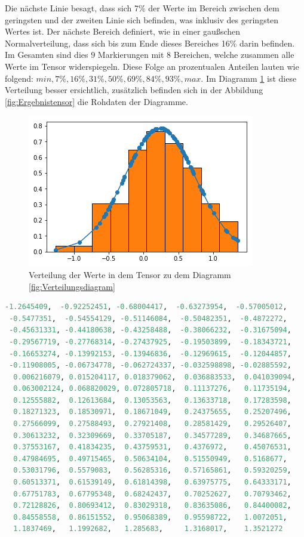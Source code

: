 Die nächste Linie besagt, dass sich 7\% der Werte im Bereich zwischen dem geringsten und der zweiten Linie sich befinden, was inklusiv des geringsten Wertes ist.  
Der nächste Bereich definiert, wie in einer gaußschen Normalverteilung, dass sich bis zum Ende dieses Bereiches 16\% darin befinden. 
Im Gesamten sind dies $9$ Markierungen mit 8 Bereichen, welche zusammen alle Werte im Tensor widerspiegeln. 
Diese Folge an prozentualen Anteilen lauten wie folgend: $min, 7\%, 16\%, 31\%, 50\%, 69\%, 84\%, 93\%, max$. 
Im Diagramm \ref{fig:VerteilungsdiagrammPython} ist diese Verteilung besser ersichtlich, zusätzlich befinden sich in der Abbildung \ref{fig:Ergebnistensor} die Rohdaten der Diagramme. 
\begin{figure}
	\centering
	\includegraphics[scale=0.6]{images/gaussian.png}
	\caption{Verteilung der Werte in dem Tensor zu dem Diagramm \ref{fig:Verteilungsdiagram}}
	\label{fig:VerteilungsdiagrammPython}
\end{figure}
\begin{lstlisting}[caption={Sortierter Ergebnistensor zum Verteilungsdiagramm \ref{fig:VerteilungsdiagrammPython} und \ref{fig:Verteilungsdiagram} im Schritt $0$},label=fig:Ergebnistensor,captionpos=b,language=Python]
 -1.2645409,  -0.92252451, -0.68004417,  -0.63273954,  -0.57005012, 
 -0.5477351,  -0.54554129, -0.51146084,  -0.50482351,  -0.4872272, 
 -0.45631331, -0.44180638, -0.43258488,  -0.38066232,  -0.31675094, 
 -0.29567719, -0.27768314, -0.27437925,  -0.19503899,  -0.18343721, 
 -0.16653274, -0.13992153, -0.13946836,  -0.12969615,  -0.12044857, 
 -0.11908005, -0.06734778, -0.062724337, -0.032598898, -0.02885592, 
  0.006216079, 0.015204117, 0.018379062,  0.036883533,  0.041039094, 
  0.063002124, 0.068820029, 0.072805718,  0.11137276,   0.11735194, 
  0.12555882,  0.12613684,  0.13053563,   0.13633718,   0.17283598, 
  0.18271323,  0.18530971,  0.18671049,   0.24375655,   0.25207496, 
  0.27566099,  0.27588493,  0.27921408,   0.28581429,   0.29526407, 
  0.30613232,  0.32309669,  0.33705187,   0.34577289,   0.34687665, 
  0.37553167,  0.41834235,  0.43759531,   0.4376972,    0.45076531, 
  0.47984695,  0.49715465,  0.50634104,   0.51550949,   0.5168677, 
  0.53031796,  0.5579083,   0.56285316,   0.57165861,   0.59320259, 
  0.60513371,  0.61539149,  0.61814398,   0.63975775,   0.64333171, 
  0.67751783,  0.67795348,  0.68242437,   0.70252627,   0.70793462, 
  0.72128826,  0.80693412,  0.83029318,   0.83635086,   0.84400082, 
  0.84558558,  0.86151552,  0.95068389,   0.95598722,   1.0072051, 
  1.1837469,   1.1992682,   1.285683,     1.3168017,    1.3521272
\end{lstlisting}


